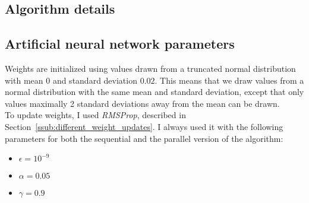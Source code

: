 \begin{appendices}
\chapter{Algorithm details}
\section{Artificial neural network parameters} %
\label{sec:artificial_neural_network_parameters}

Weights are initialized using values drawn from a truncated normal distribution with mean $0$ and standard deviation $0.02$. This means that we draw values from a normal distribution with the same mean and standard deviation, except that only values maximally 2 standard deviations away from the mean can be drawn.\\
To update weights, I used \textit{RMSProp}, described in Section~\ref{ssub:different_weight_updates}. I always used it with the following parameters for both the sequential and the parallel version of the algorithm:
\begin{itemize}
    \item $\epsilon = 10^{-9}$
    \item $\alpha = 0.05$
    \item $\gamma = 0.9$
\end{itemize}


\end{appendices}
